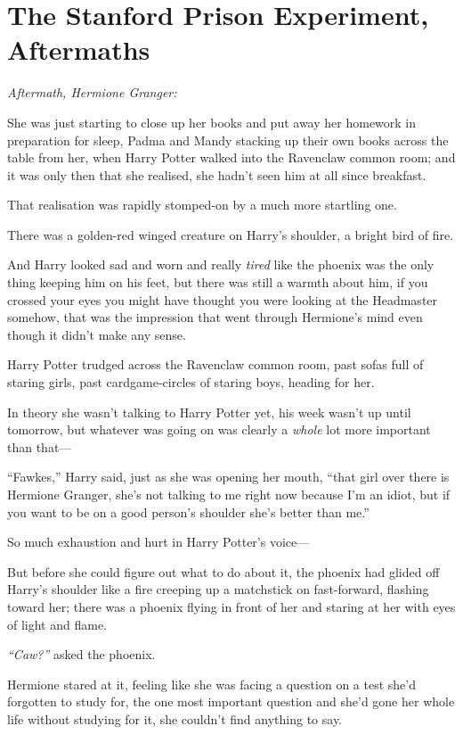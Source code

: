 \chapter{The Stanford Prison Experiment, Aftermaths}

\emph{Aftermath, Hermione Granger:}

She was just starting to close up her books and put away her homework in
preparation for sleep, Padma and Mandy stacking up their own books
across the table from her, when Harry Potter walked into the Ravenclaw
common room; and it was only then that she realised, she hadn't seen him
at all since breakfast.

That realisation was rapidly stomped-on by a much more startling one.

There was a golden-red winged creature on Harry's shoulder, a bright
bird of fire.

And Harry looked sad and worn and really \emph{tired} like the phoenix
was the only thing keeping him on his feet, but there was still a warmth
about him, if you crossed your eyes you might have thought you were
looking at the Headmaster somehow, that was the impression that went
through Hermione's mind even though it didn't make any sense.

Harry Potter trudged across the Ravenclaw common room, past sofas full
of staring girls, past cardgame-circles of staring boys, heading for
her.

In theory she wasn't talking to Harry Potter yet, his week wasn't up
until tomorrow, but whatever was going on was clearly a \emph{whole} lot
more important than that---

``Fawkes,'' Harry said, just as she was opening her mouth, ``that girl
over there is Hermione Granger, she's not talking to me right now
because I'm an idiot, but if you want to be on a good person's shoulder
she's better than me.''

So much exhaustion and hurt in Harry Potter's voice---

But before she could figure out what to do about it, the phoenix had
glided off Harry's shoulder like a fire creeping up a matchstick on
fast-forward, flashing toward her; there was a phoenix flying in front
of her and staring at her with eyes of light and flame.

\emph{``Caw?''} asked the phoenix.

Hermione stared at it, feeling like she was facing a question on a test
she'd forgotten to study for, the one most important question and she'd
gone her whole life without studying for it, she couldn't find anything
to say.

